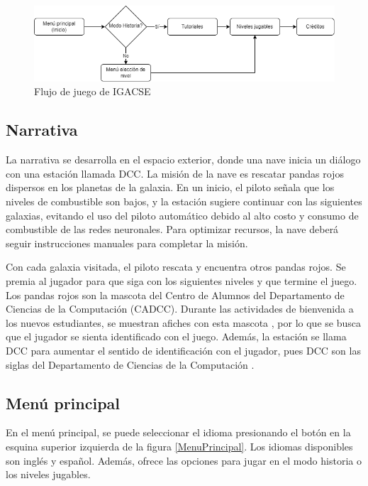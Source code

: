 \begin{figure}[h]
	\centering
	\includegraphics[scale=.5]{imagenes/FlujoDeJuego.png}
	\caption{ Flujo de juego de IGACSE}
	\label{FlujoDeJuego}
\end{figure}


\subsection{Narrativa}

La narrativa se desarrolla en el espacio exterior, donde una nave inicia un diálogo con una estación llamada DCC. La misión de la nave es rescatar pandas rojos dispersos en los planetas de la galaxia. En un inicio, el piloto señala que los niveles de combustible son bajos, y la estación sugiere continuar con las siguientes galaxias, evitando el uso del piloto automático debido al alto costo y consumo de combustible de las redes neuronales. Para optimizar recursos, la nave deberá seguir instrucciones manuales para completar la misión.

Con cada galaxia visitada, el piloto rescata y encuentra otros pandas rojos. Se premia al jugador para que siga con los siguientes niveles y que termine el juego. Los pandas rojos son la mascota del Centro de Alumnos del Departamento de Ciencias  de la Computación (CADCC).  Durante las actividades de bienvenida a los nuevos estudiantes, se muestran afiches con esta mascota \cite{CADCCPage}, por lo que se busca que el jugador se sienta identificado con el juego. Además, la estación se llama DCC para aumentar el sentido de identificación con el jugador, pues DCC son las siglas del Departamento de Ciencias de la Computación \cite{DCCPage}.


\subsection{Menú principal}

En el menú principal, se puede seleccionar el idioma presionando el botón en la esquina superior izquierda de la figura \ref{MenuPrincipal}. Los idiomas disponibles son inglés y español. Además, ofrece las opciones para jugar en el modo historia o los niveles jugables.

